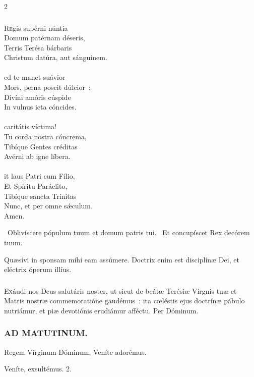 \documentclass[9pt,twoside]{extarticle}
\begin{document}
\begin{multicols}{2}
{\subsubsection*{\center {}}
\begin{center}\end{center}
\lettrine{R}egis supérni núntia\\
Domum patérnam déseris,\\
Terris Terésa bárbaris\\
Christum datúra, aut sánguinem.\\
\\
ed te manet suávior\\
Mors, pœna poscit dúlcior~:\\
Divíni amóris cúspide\\
In vulnus icta cóncides.\\
\\
 caritátis víctima!\\
Tu corda nostra cóncrema,\\
Tibíque Gentes créditas\\
Avérni ab igne líbera.\\
\\
it laus Patri cum Fílio,\\
Et Spíritu Paráclito,\\
Tibíque sancta Trínitas\\
Nunc, et per omne sǽculum.\\
Amen.

\begin{tightlist}{}
\item {}~Oblivíscere pópulum tuum et domum patris tui. ~Et concupíscet Rex decórem tuum.
\item {} Quæsívi in sponsam mihi eam assúmere. Doctrix enim est disciplínæ Dei, et eléctrix óperum illíus.
\end{tightlist}

\subsubsection*{\center {}}
\lettrine{E}xáudi nos Deus salutáris noster, ut sicut de beátæ Terésiæ Vírgnis tuæ et Matris nostræ commemoratióne gaudémus~: ita cœléstis ejus doctrínæ pábulo nutriámur, et piæ devotiónis erudiámur afféctu. Per Dóminum.

\subsubsection*{\center \textsc{AD MATUTINUM.}}
\begin{tightlist}{}
\item {} Regem Vírginum Dóminum, \textred{*} Veníte adorémus.
\item {} Veníte, exsultémus. 2.
\item {}
\end{tightlist}

}
\end{multicols}
\end{document}

